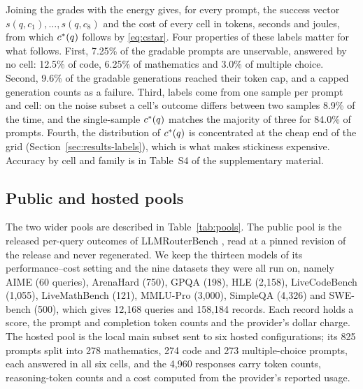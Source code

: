 Joining the grades with the energy gives, for every prompt, the success
vector $s(q, c_1), \dots, s(q, c_8)$ and the cost of every cell in tokens,
seconds and joules, from which $c^{*}(q)$ follows by \eqref{eq:cstar}. Four
properties of these labels matter for what follows. First, 7.25\% of the
gradable prompts are unservable, answered by no cell: 12.5\% of code, 6.25\%
of mathematics and 3.0\% of multiple choice. Second, 9.6\% of the gradable
generations reached their token cap, and a capped generation counts as a
failure. Third, labels come from one sample per prompt and cell: on the noise
subset a cell's outcome differs between two samples 8.9\% of the time, and
the single-sample $c^{*}(q)$ matches the majority of three for 84.0\% of
prompts. Fourth, the distribution of $c^{*}(q)$ is concentrated at the cheap
end of the grid (Section~\ref{sec:results-labels}), which is what makes
stickiness expensive. Accuracy by cell and family is in Table~S4 of the
supplementary material.

\subsection{Public and hosted pools}
\label{sec:data-pools}

The two wider pools are described in Table~\ref{tab:pools}. The public pool
is the released per-query outcomes of LLMRouterBench
\cite{li2026llmrouterbench}, read at a pinned revision of the release and
never regenerated. We keep the thirteen models of its performance--cost
setting and the nine datasets they were all run on, namely AIME (60
queries), ArenaHard (750), GPQA (198), HLE (2{,}158), LiveCodeBench
(1{,}055), LiveMathBench (121), MMLU-Pro (3{,}000), SimpleQA (4{,}326) and
SWE-bench (500), which gives 12{,}168 queries and 158{,}184 records. Each
record holds a score, the prompt and completion token counts and the
provider's dollar charge. The hosted pool is the local main subset sent to
six hosted configurations; its 825 prompts split into 278 mathematics, 274
code and 273 multiple-choice prompts, each answered in all six cells, and the
4{,}960 responses carry token counts, reasoning-token counts and a cost
computed from the provider's reported usage.

